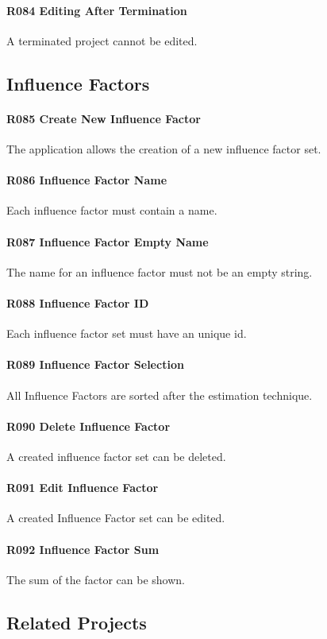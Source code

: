 \paragraph{R084 Editing After Termination}
A terminated project cannot be edited.
 
\subsection{Influence Factors} 
\paragraph{R085 Create New Influence Factor}
The application allows the creation of a new influence factor set.
\paragraph{R086 Influence Factor Name}
Each influence factor must contain a name.
\paragraph{R087 Influence Factor Empty Name}
The name for an influence factor must not be an empty string.
\paragraph{R088 Influence Factor ID}
Each influence factor set must have an unique id.
\paragraph{R089 Influence Factor Selection}
All Influence Factors are sorted after the estimation technique.
\paragraph{R090 Delete Influence Factor}
A created influence factor set can be deleted.
\paragraph{R091 Edit Influence Factor}
A created Influence Factor set can be edited.
\paragraph{R092 Influence Factor Sum}
The sum of the factor can be shown.

\subsection{Related Projects}
